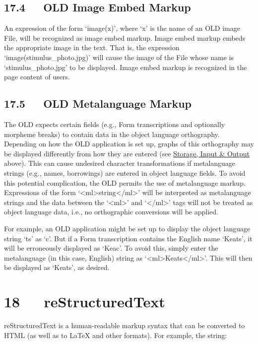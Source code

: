 \documentclass[letterpaper,10pt,english]{sphinxmanual}
\begin{document}
\section{17.4   OLD Image Embed Markup}
\label{documentation:old-image-embed-markup}
An expression of the form `image(x)', where `x' is the name of an OLD image
File, will be recognized as image embed markup.  Image embed markup embeds the
appropriate image in the text.  That is, the expression
`image(stimulus\_photo.jpg)' will cause the image of the File whose name is
`stimulus\_photo.jpg' to be displayed.  Image embed markup is recognized in the
page content of users.


\section{17.5   OLD Metalanguage Markup}
\label{documentation:old-metalanguage-markup}
The OLD expects certain fields (e.g., Form transcriptions and optionally
morpheme breaks) to contain data in the object language orthography.  Depending
on how the OLD application is set up, graphs of this orthography may be
displayed differently from how they are entered (see {\hyperref[documentation:storage-input-output]{Storage, Input \& Output}}
above).  This can cause undesired character transformations if metalanguage
strings (e.g., names, borrowings) are entered in object language fields.  To
avoid this potential complication, the OLD permits the use of metalanguage
markup.  Expressions of the form `\textless{}ml\textgreater{}string\textless{}/ml\textgreater{}' will be interpreted as
metalanguage strings and the data between the `\textless{}ml\textgreater{}' and `\textless{}/ml\textgreater{}' tags will not
be treated as object language data, i.e., no orthographic conversions will be
applied.

For example, an OLD application might be set up to display the object language
string `ts' as `c'.  But if a Form transcription contains the English name
`Keats', it will be erroneously displayed as `Keac'.  To avoid this, simply
enter the metalanguage (in this case, English) string as `\textless{}ml\textgreater{}Keats\textless{}/ml\textgreater{}'.  This
will then be displayed as `Keats', as desired.


\chapter{18   reStructuredText}
\label{documentation:restructuredtext}
reStructuredText is a human-readable markup syntax that can be converted to
HTML (as well as to LaTeX and other formats).  For example, the string:
\begin{quote}


\code{================}
\end{quote}
\end{document}
